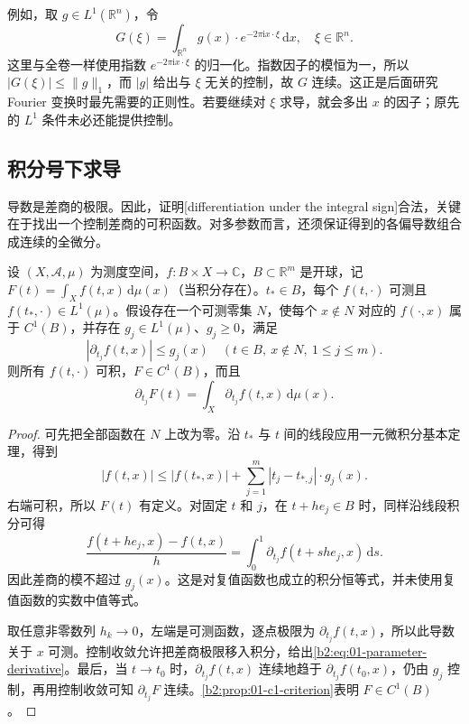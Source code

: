 \ProseParagraphBreak

例如，取 \(g\in L^1(\mathbb R^n)\)，令
\[
G(\xi)=\int_{\mathbb R^n}g(x)\cdot e^{-2\pi\mathrm{i}x\cdot\xi}\,\mathrm{d}x,
\quad \xi\in\mathbb R^n.
\]
这里与全卷一样使用指数 \(e^{-2\pi\mathrm{i}x\cdot\xi}\) 的归一化。指数因子的模恒为一，所以 \(|G(\xi)|\leq\|g\|_1\)，而 \(|g|\) 给出与 \(\xi\) 无关的控制，故 \(G\) 连续。这正是后面研究 Fourier 变换时最先需要的正则性。若要继续对 \(\xi\) 求导，就会多出 \(x\) 的因子；原先的 \(L^1\) 条件未必还能提供控制。

\subsection{积分号下求导}
\label{b2:subsec:010302}

导数是差商的极限。因此，证明[differentiation under the integral sign]合法，关键在于找出一个控制差商的可积函数。对多参数而言，还须保证得到的各偏导数组合成连续的全微分。

\begin{theorem}\label{b2:thm:01-parameter-differentiation}
设 \((X,\mathcal A,\mu)\) 为测度空间，\(f:B\times X\to\mathbb C\)，\(B\subset\mathbb R^m\) 是开球，记 \(F(t)=\int_X f(t,x)\,\mathrm d\mu(x)\)（当积分存在）。\(t_*\in B\)，每个 \(f(t,\cdot)\) 可测且 \(f(t_*,\cdot)\in L^1(\mu)\)。假设存在一个可测零集 \(N\)，使每个 \(x\notin N\) 对应的 \(f(\cdot,x)\) 属于 \(C^1(B)\)，并存在 \(g_j\in L^1(\mu)\)、\(g_j\geq0\)，满足
\[
|\partial_{t_j}f(t,x)|\leq g_j(x)
\quad(t\in B,\ x\notin N,\ 1\leq j\leq m).
\]
则所有 \(f(t,\cdot)\) 可积，\(F\in C^1(B)\)，而且
\begin{equation}\label{b2:eq:01-parameter-derivative}
\partial_{t_j}F(t)=\int_X\partial_{t_j}f(t,x)\,\mathrm{d}\mu(x).
\end{equation}
\end{theorem}
\begin{proof}
可先把全部函数在 \(N\) 上改为零。沿 \(t_*\) 与 \(t\) 间的线段应用一元微积分基本定理，得到
\[
|f(t,x)|\leq |f(t_*,x)|+\sum_{j=1}^m|t_j-t_{*,j}|\cdot g_j(x).
\]
右端可积，所以 \(F(t)\) 有定义。对固定 \(t\) 和 \(j\)，在 \(t+he_j\in B\) 时，同样沿线段积分可得
\[
\frac{f(t+he_j,x)-f(t,x)}{h}
=\int_0^1\partial_{t_j}f(t+she_j,x)\,\mathrm{d}s.
\]
因此差商的模不超过 \(g_j(x)\)。这是对复值函数也成立的积分恒等式，并未使用复值函数的实数中值等式。

取任意非零数列 \(h_k\to0\)，左端是可测函数，逐点极限为 \(\partial_{t_j}f(t,x)\)，所以此导数关于 \(x\) 可测。控制收敛允许把差商极限移入积分，给出\eqref{b2:eq:01-parameter-derivative}。最后，当 \(t\to t_0\) 时，\(\partial_{t_j}f(t,x)\) 连续地趋于 \(\partial_{t_j}f(t_0,x)\)，仍由 \(g_j\) 控制，再用控制收敛可知 \(\partial_{t_j}F\) 连续。\cref{b2:prop:01-c1-criterion}表明 \(F\in C^1(B)\)。
\end{proof}

